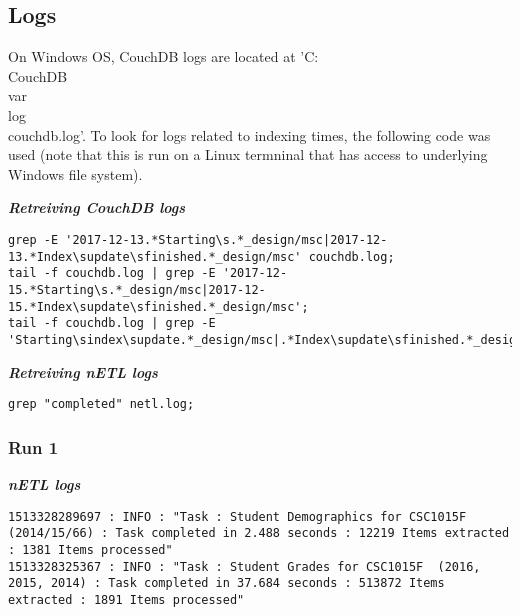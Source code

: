 \subsection{Logs}
On Windows OS, CouchDB logs are located at 'C:\\CouchDB\\var\\log\\couchdb.log'. To look for logs related to indexing times, the following code was used (note that this is run on a Linux termninal that has access to underlying Windows file system).

\textit{\textbf{Retreiving CouchDB logs}}
\begin{verbatim}
grep -E '2017-12-13.*Starting\s.*_design/msc|2017-12-13.*Index\supdate\sfinished.*_design/msc' couchdb.log;
tail -f couchdb.log | grep -E '2017-12-15.*Starting\s.*_design/msc|2017-12-15.*Index\supdate\sfinished.*_design/msc';
tail -f couchdb.log | grep -E 'Starting\sindex\supdate.*_design/msc|.*Index\supdate\sfinished.*_design/msc'
\end{verbatim}

\textit{\textbf{Retreiving nETL logs}}
\begin{verbatim}
grep "completed" netl.log;
\end{verbatim}


\subsubsection{Run 1}
\textit{\textbf{nETL logs}}
\begin{verbatim}
1513328289697 : INFO : "Task : Student Demographics for CSC1015F (2014/15/66) : Task completed in 2.488 seconds : 12219 Items extracted : 1381 Items processed"
1513328325367 : INFO : "Task : Student Grades for CSC1015F  (2016, 2015, 2014) : Task completed in 37.684 seconds : 513872 Items extracted : 1891 Items processed"
\end{verbatim}

